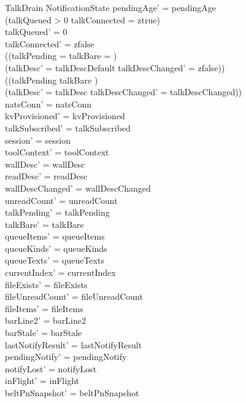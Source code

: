 \documentclass[a4paper,10pt,fleqn]{article}
\begin{document}
\begin{schema}{TalkDrain}
  \Delta NotificationState
  \where
  pendingAge' = pendingAge \\
  (talkQueued > 0 \lor talkConnected = ztrue) \\
  talkQueued' = 0 \\
  talkConnected' = zfalse \\
  ((\dom talkPending = \emptyset \land talkBare = \emptyset) \implies \\
  \quad (talkDesc' = talkDescDefault \land talkDescChanged' = zfalse)) \\
  ((\dom talkPending \neq \emptyset \lor talkBare \neq \emptyset) \implies \\
  \quad (talkDesc' = talkDesc \land talkDescChanged' = talkDescChanged)) \\
  natsConn' = natsConn \\
  kvProvisioned' = kvProvisioned \\
  talkSubscribed' = talkSubscribed \\
  session' = session \\
  toolContext' = toolContext \\
  wallDesc' = wallDesc \\
  readDesc' = readDesc \\
  wallDescChanged' = wallDescChanged \\
  unreadCount' = unreadCount \\
  talkPending' = talkPending \\
  talkBare' = talkBare \\
  queueItems' = queueItems \\
  queueKinds' = queueKinds \\
  queueTexts' = queueTexts \\
  currentIndex' = currentIndex \\
  fileExists' = fileExists \\
  fileUnreadCount' = fileUnreadCount \\
  fileItems' = fileItems \\
  barLine2' = barLine2 \\
  barStale' = barStale \\
  lastNotifyResult' = lastNotifyResult \\
  pendingNotify' = pendingNotify \\
  notifyLost' = notifyLost \\
  inFlight' = inFlight \\
  beltPnSnapshot' = beltPnSnapshot \\

\end{schema}
\end{document}

